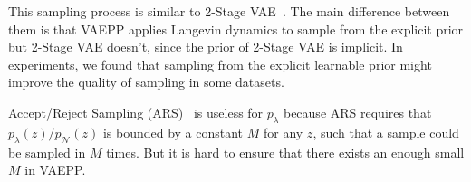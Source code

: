 This sampling process is similar to 2-Stage VAE~\cite{dai2019diagnosing}. The main difference between them is that VAEPP applies Langevin dynamics to sample from the explicit prior but 2-Stage VAE doesn't, since the prior of 2-Stage VAE is implicit. In experiments, we found that sampling from the explicit learnable prior might improve the quality of sampling in some datasets. 

Accept/Reject Sampling (ARS)~\cite{bauer2019resampled} is useless for $p_\lambda$ because ARS requires that $p_\lambda(z) / p_\mathcal{N}(z)$ is bounded by a constant $M$ for any $z$, such that a sample could be sampled in $M$ times. But it is hard to ensure that there exists an enough small $M$ in VAEPP.
 
 